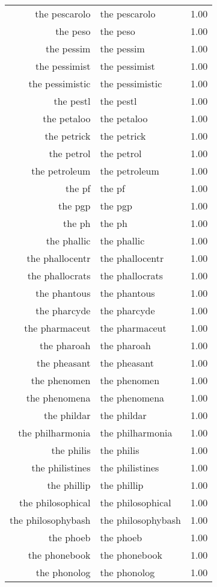 \begin{table}[ht]
\begin{tabular}{rlr}
  the pescarolo & the pescarolo & 1.00 \\ 
  the peso & the peso & 1.00 \\ 
  the pessim & the pessim & 1.00 \\ 
  the pessimist & the pessimist & 1.00 \\ 
  the pessimistic & the pessimistic & 1.00 \\ 
  the pestl & the pestl & 1.00 \\ 
  the petaloo & the petaloo & 1.00 \\ 
  the petrick & the petrick & 1.00 \\ 
  the petrol & the petrol & 1.00 \\ 
  the petroleum & the petroleum & 1.00 \\ 
  the pf & the pf & 1.00 \\ 
  the pgp & the pgp & 1.00 \\ 
  the ph & the ph & 1.00 \\ 
  the phallic & the phallic & 1.00 \\ 
  the phallocentr & the phallocentr & 1.00 \\ 
  the phallocrats & the phallocrats & 1.00 \\ 
  the phantous & the phantous & 1.00 \\ 
  the pharcyde & the pharcyde & 1.00 \\ 
  the pharmaceut & the pharmaceut & 1.00 \\ 
  the pharoah & the pharoah & 1.00 \\ 
  the pheasant & the pheasant & 1.00 \\ 
  the phenomen & the phenomen & 1.00 \\ 
  the phenomena & the phenomena & 1.00 \\ 
  the phildar & the phildar & 1.00 \\ 
  the philharmonia & the philharmonia & 1.00 \\ 
  the philis & the philis & 1.00 \\ 
  the philistines & the philistines & 1.00 \\ 
  the phillip & the phillip & 1.00 \\ 
  the philosophical & the philosophical & 1.00 \\ 
  the philosophybash & the philosophybash & 1.00 \\ 
  the phoeb & the phoeb & 1.00 \\ 
  the phonebook & the phonebook & 1.00 \\ 
  the phonolog & the phonolog & 1.00 \\ 

\end{tabular}
\end{table}

